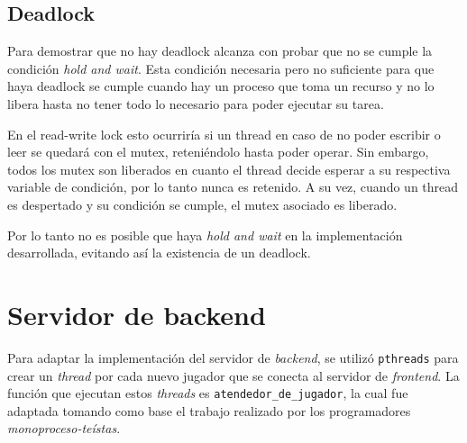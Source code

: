 \documentclass[a4paper]{article}
\begin{document}
\subsection{Deadlock}

Para demostrar que no hay deadlock alcanza con probar que no se cumple la
condición \emph{hold and wait}. Esta condición necesaria pero no suficiente para
que haya deadlock se cumple cuando hay un proceso que toma un recurso y no lo
libera hasta no tener todo lo necesario para poder ejecutar su tarea.

En el read-write lock esto ocurriría si un thread en caso de no poder escribir o
leer se quedará con el mutex, reteniéndolo hasta poder operar. Sin embargo,
todos los mutex son liberados en cuanto el thread decide esperar a su respectiva
variable de condición, por lo tanto nunca es retenido. A su vez, cuando un
thread es despertado y su condición se cumple, el mutex asociado es liberado.

Por lo tanto no es posible que haya \emph{hold and wait} en la implementación
desarrollada, evitando así la existencia de un deadlock.

\section{Servidor de backend}
Para adaptar la implementación del servidor de \emph{backend}, se utilizó
\texttt{pthreads} para crear un \emph{thread} por cada nuevo jugador que se
conecta al servidor de \emph{frontend}. La función que ejecutan estos
\emph{threads} es \texttt{atendedor\_de\_jugador}, la cual fue adaptada
tomando como base el trabajo realizado por los programadores \emph
{monoproceso-teístas}.
\end{document}

